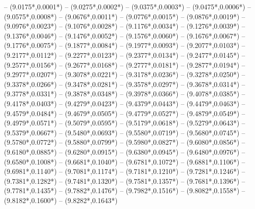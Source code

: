 {	-- ({9.0175*\dx},{0.0001*\dy})
	-- ({9.0275*\dx},{0.0002*\dy})
	-- ({9.0375*\dx},{0.0003*\dy})
	-- ({9.0475*\dx},{0.0006*\dy})
	-- ({9.0575*\dx},{0.0008*\dy})
	-- ({9.0676*\dx},{0.0011*\dy})
	-- ({9.0776*\dx},{0.0015*\dy})
	-- ({9.0876*\dx},{0.0019*\dy})
	-- ({9.0976*\dx},{0.0023*\dy})
	-- ({9.1076*\dx},{0.0028*\dy})
	-- ({9.1176*\dx},{0.0034*\dy})
	-- ({9.1276*\dx},{0.0039*\dy})
	-- ({9.1376*\dx},{0.0046*\dy})
	-- ({9.1476*\dx},{0.0052*\dy})
	-- ({9.1576*\dx},{0.0060*\dy})
	-- ({9.1676*\dx},{0.0067*\dy})
	-- ({9.1776*\dx},{0.0075*\dy})
	-- ({9.1877*\dx},{0.0084*\dy})
	-- ({9.1977*\dx},{0.0093*\dy})
	-- ({9.2077*\dx},{0.0103*\dy})
	-- ({9.2177*\dx},{0.0112*\dy})
	-- ({9.2277*\dx},{0.0123*\dy})
	-- ({9.2377*\dx},{0.0134*\dy})
	-- ({9.2477*\dx},{0.0145*\dy})
	-- ({9.2577*\dx},{0.0156*\dy})
	-- ({9.2677*\dx},{0.0168*\dy})
	-- ({9.2777*\dx},{0.0181*\dy})
	-- ({9.2877*\dx},{0.0194*\dy})
	-- ({9.2977*\dx},{0.0207*\dy})
	-- ({9.3078*\dx},{0.0221*\dy})
	-- ({9.3178*\dx},{0.0236*\dy})
	-- ({9.3278*\dx},{0.0250*\dy})
	-- ({9.3378*\dx},{0.0266*\dy})
	-- ({9.3478*\dx},{0.0281*\dy})
	-- ({9.3578*\dx},{0.0297*\dy})
	-- ({9.3678*\dx},{0.0314*\dy})
	-- ({9.3778*\dx},{0.0331*\dy})
	-- ({9.3878*\dx},{0.0348*\dy})
	-- ({9.3978*\dx},{0.0366*\dy})
	-- ({9.4078*\dx},{0.0385*\dy})
	-- ({9.4178*\dx},{0.0403*\dy})
	-- ({9.4279*\dx},{0.0423*\dy})
	-- ({9.4379*\dx},{0.0443*\dy})
	-- ({9.4479*\dx},{0.0463*\dy})
	-- ({9.4579*\dx},{0.0484*\dy})
	-- ({9.4679*\dx},{0.0505*\dy})
	-- ({9.4779*\dx},{0.0527*\dy})
	-- ({9.4879*\dx},{0.0549*\dy})
	-- ({9.4979*\dx},{0.0571*\dy})
	-- ({9.5079*\dx},{0.0595*\dy})
	-- ({9.5179*\dx},{0.0618*\dy})
	-- ({9.5279*\dx},{0.0643*\dy})
	-- ({9.5379*\dx},{0.0667*\dy})
	-- ({9.5480*\dx},{0.0693*\dy})
	-- ({9.5580*\dx},{0.0719*\dy})
	-- ({9.5680*\dx},{0.0745*\dy})
	-- ({9.5780*\dx},{0.0772*\dy})
	-- ({9.5880*\dx},{0.0799*\dy})
	-- ({9.5980*\dx},{0.0827*\dy})
	-- ({9.6080*\dx},{0.0856*\dy})
	-- ({9.6180*\dx},{0.0885*\dy})
	-- ({9.6280*\dx},{0.0915*\dy})
	-- ({9.6380*\dx},{0.0945*\dy})
	-- ({9.6480*\dx},{0.0976*\dy})
	-- ({9.6580*\dx},{0.1008*\dy})
	-- ({9.6681*\dx},{0.1040*\dy})
	-- ({9.6781*\dx},{0.1072*\dy})
	-- ({9.6881*\dx},{0.1106*\dy})
	-- ({9.6981*\dx},{0.1140*\dy})
	-- ({9.7081*\dx},{0.1174*\dy})
	-- ({9.7181*\dx},{0.1210*\dy})
	-- ({9.7281*\dx},{0.1246*\dy})
	-- ({9.7381*\dx},{0.1282*\dy})
	-- ({9.7481*\dx},{0.1320*\dy})
	-- ({9.7581*\dx},{0.1357*\dy})
	-- ({9.7681*\dx},{0.1396*\dy})
	-- ({9.7781*\dx},{0.1435*\dy})
	-- ({9.7882*\dx},{0.1476*\dy})
	-- ({9.7982*\dx},{0.1516*\dy})
	-- ({9.8082*\dx},{0.1558*\dy})
	-- ({9.8182*\dx},{0.1600*\dy})
	-- ({9.8282*\dx},{0.1643*\dy})
}
